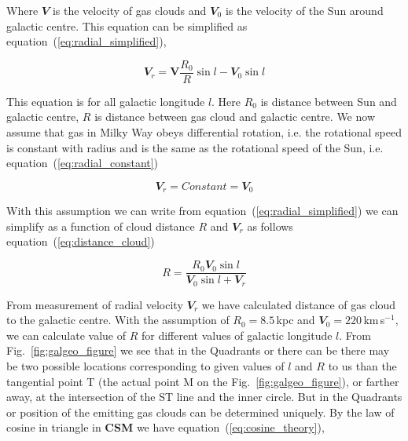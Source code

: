 \documentclass[fleqn,usenatbib]{mnras}
\begin{document}
Where $\mathbfit{V}$ is the velocity of gas clouds and $\mathbfit{V}_{0}$ is the velocity of the Sun around galactic centre. This equation can be simplified as equation~(\ref{eq:radial_simplified}),

\begin{equation}
 \mathbfit{V}_{r}=\mathbf{V}\frac{\mathit{R}_{0}}{\mathit{R}}\sin l-\mathbfit{V}_{0}\sin l
 \label{eq:radial_simplified}
\end{equation} 

This equation is for all galactic longitude $\mathit{l}$. Here $\mathit{R}_{0}$ is distance between Sun and galactic centre, $\mathit{R}$ is distance between  gas cloud and galactic centre. We now assume that gas in Milky Way obeys differential rotation, i.e. the rotational speed is constant with radius and is the same as the rotational speed of the Sun, i.e. equation~(\ref{eq:radial_constant})

\begin{equation}
 \mathbfit{V}_{r}=Constant=\mathbfit{V}_{0}
 \label{eq:radial_constant}
\end{equation}

With this assumption we can write from equation~(\ref{eq:radial_simplified}) we can simplify as a function of cloud distance $\mathit{R}$ and $\mathbfit{V}_{r}$  as follows equation~(\ref{eq:distance_cloud})

\begin{equation}
 \mathit{R}=\frac{\mathit{R}_{0}\mathbfit{V}_{0}\sin l}{\mathbfit{V}_{0}\sin l+\mathbfit{V}_{r}}
 \label{eq:distance_cloud}
\end{equation}

From measurement of radial velocity $\mathbfit{V}_{r}$ we have calculated distance of gas cloud to the galactic centre. With the assumption of $\mathit{R}_{0}=8.5$\,kpc and $\mathbfit{V}_{0}=220$\,km\,s$^{-1}$, we can calculate value of $\mathit{R}$ for different values of galactic longitude $\mathit{l}$. From Fig.~\ref{fig:galgeo_figure} we see that in the Quadrants  or  there can be there may be two possible locations corresponding to given values of $\mathit{l}$ and $\mathit{R}$ to us than the tangential point T (the actual point M on the Fig.~\ref{fig:galgeo_figure}), or farther away, at the intersection of the ST line and the inner circle. But in the Quadrants  or  position of the emitting gas clouds can be determined uniquely\citep{CathyHorellou2015}. By the law of cosine in triangle in \textbf{CSM} we have equation~(\ref{eq:cosine_theory}),
\end{document}
